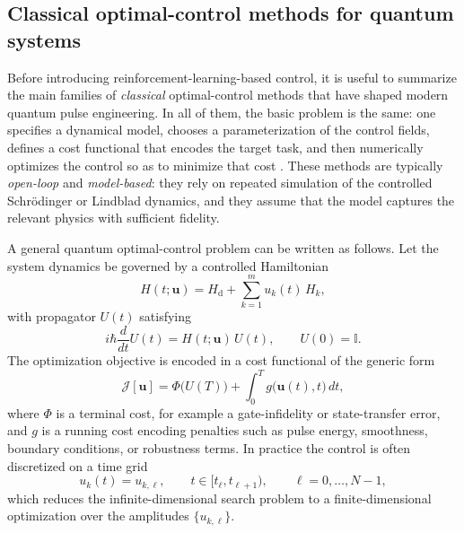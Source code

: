 \subsection{Classical optimal-control methods for quantum systems}
\label{subsec:classical_qoc_methods}

Before introducing reinforcement-learning-based control, it is useful to summarize the main families of \emph{classical} optimal-control methods that have shaped modern quantum pulse engineering. In all of them, the basic problem is the same: one specifies a dynamical model, chooses a parameterization of the control fields, defines a cost functional that encodes the target task, and then numerically optimizes the control so as to minimize that cost \cite{Khaneja2005,Palao2003,Reich2012,Caneva2011,Machnes2018}. These methods are typically \emph{open-loop} and \emph{model-based}: they rely on repeated simulation of the controlled Schr\"odinger or Lindblad dynamics, and they assume that the model captures the relevant physics with sufficient fidelity.

A general quantum optimal-control problem can be written as follows. Let the system dynamics be governed by a controlled Hamiltonian
\begin{equation}
H(t;\bm{u})
=
H_{\mathrm{d}}
+
\sum_{k=1}^{m} u_k(t)\,H_k,
\label{eq:qoc_controlled_hamiltonian}
\end{equation}
with propagator $U(t)$ satisfying
\begin{equation}
i\hbar \frac{d}{dt} U(t)
=
H(t;\bm{u})\,U(t),
\qquad
U(0)=\mathbb{I}.
\label{eq:qoc_propagator_equation}
\end{equation}
The optimization objective is encoded in a cost functional of the generic form
\begin{equation}
\mathcal{J}[\bm{u}]
=
\Phi\!\bigl(U(T)\bigr)
+
\int_{0}^{T} g\!\bigl(\bm{u}(t),t\bigr)\,dt,
\label{eq:qoc_cost_functional}
\end{equation}
where $\Phi$ is a terminal cost, for example a gate-infidelity or state-transfer error, and $g$ is a running cost encoding penalties such as pulse energy, smoothness, boundary conditions, or robustness terms. In practice the control is often discretized on a time grid
\begin{equation}
u_k(t)=u_{k,\ell},
\qquad
t\in[t_\ell,t_{\ell+1}),
\qquad
\ell=0,\dots,N-1,
\label{eq:qoc_piecewise_constant}
\end{equation}
which reduces the infinite-dimensional search problem to a finite-dimensional optimization over the amplitudes $\{u_{k,\ell}\}$.


